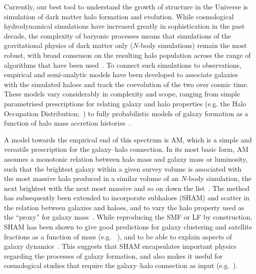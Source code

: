 \documentclass[usenatbib,useAMS]{mnras}
\begin{document}
Currently, our best tool to understand the growth of structure in the Universe is simulation of dark matter halo formation and evolution. While cosmological hydrodynamical simulations have increased greatly in sophistication in the past decade, the complexity of baryonic processes means that simulations of the gravitational physics of dark matter only ($N$-body simulations) remain the most robust, with broad consensus on the resulting halo population across the range of algorithms that have been used~\citep{NFW,Knebe2011,Schneider}. To connect such simulations to observations, empirical and semi-analytic models have been developed to associate galaxies with the simulated haloes and track the coevolution of the two over cosmic time. These models vary considerably in complexity and scope, ranging from simple parametrised prescriptions for relating galaxy and halo properties (e.g. the Halo Occupation Distribution;~\citealt{Kravtsov_HOD, Zheng_HOD, Skibba}) to fully probabilistic models of galaxy formation as a function of halo mass accretion histories~\citep{EMERGE2018, Universe_machine, EMERGE}.

A model towards the empirical end of this spectrum is \ac{AM}, which is a simple and versatile prescription for the galaxy--halo connection. In its most basic form, \ac{AM} assumes a monotonic relation between halo mass and galaxy mass or luminosity, such that the brightest galaxy within a given survey volume is associated with the most massive halo produced in a similar volume of an $N$-body simulation, the next brightest with the next most massive and so on down the list~\citep{Kravtsov_HOD, Vale2004, Conroy2006, Behroozi2010, Moster2010}.
The method has subsequently been extended to incorporate subhaloes (\ac{SHAM}) and scatter in the relation between galaxies and haloes, and to vary the halo property used as the ``proxy'' for galaxy mass~\citep{Behroozi2010, Reddick2013, Chaves-Montero2016, Lehmann}. While reproducing the \ac{SMF} or \ac{LF} by construction, \ac{SHAM} has been shown to give good predictions for galaxy clustering and satellite fractions as a function of mass (e.g. ~\citealt{Conroy2006, Reddick2013, Lehmann}), and to be able to explain aspects of galaxy dynamics~\citep{Desmond_TFR, Desmond_FJR, Desmond_MDAR}. This suggests that \ac{SHAM} encapsulates important physics regarding the processes of galaxy formation, and also makes it useful for cosmological studies that require the galaxy--halo connection as input (e.g.~\citealt{Reddick_cosmo}).
\end{document}
